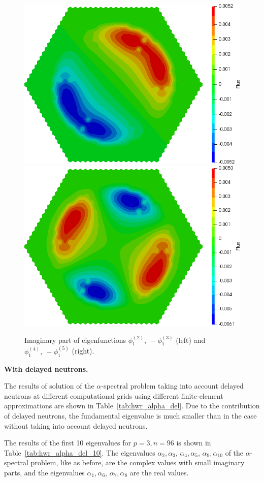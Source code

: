 \documentclass[authoryear]{elsarticle}
\begin{document}
\begin{figure}[H]
\begin{center}
	\includegraphics[width=0.49\linewidth]{hwr/alpha_sp3_cx1_2.png}
	\includegraphics[width=0.49\linewidth]{hwr/alpha_sp3_cx1_4.png}\\
	\caption{Imaginary part of eigenfunctions $\phi^{(2)}_1, \ - \phi^{(3)}_1$ (left) and $\phi^{(4)}_1, \ - \phi^{(5)}_1$ (right).}
	\label{fig:hwr_fun_3}
\end{center}
\end{figure}

\textbf{With delayed neutrons.}

The results of solution of the $\alpha$-spectral problem taking into account delayed neutrons at different computational grids using different finite-element approximations are shown in Table~\ref{tab:hwr_alpha_del}. 
Due to the contribution of delayed neutrons, the fundamental eigenvalue is much smaller than in the case without taking into account delayed neutrons.

The results of the first 10 eigenvalues for $p = 3, n = 96 $ is shown in Table~\ref{tab:hwr_alpha_del_10}.
The eigenvalues $\alpha_2, \alpha_3$, $\alpha_4, \alpha_5$, $\alpha_9, \alpha_{10}$ of the $\alpha$-spectral problem, like as before, are the complex values with small imaginary parts, and the eigenvalues $\alpha_1, \alpha_6$, $\alpha_7, \alpha_8$ are the real values.
\end{document}
